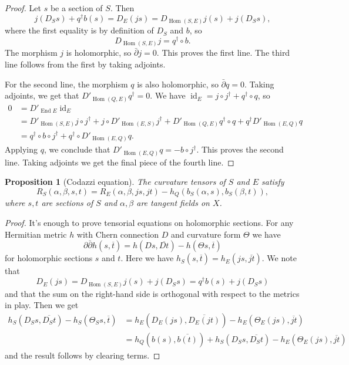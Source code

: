\documentclass[10pt,a4paper]{article}
\newtheorem{prop}[theo]{Proposition}
\newtheorem*{proof}{Proof}
\def\ov#1{\overline{#1}}
\DeclareMathOperator{\End}{End}
\DeclareMathOperator{\Hom}{Hom}
\DeclareMathOperator{\id}{id}
\begin{document}
\begin{proof}
Let $s$ be a section of $S$. Then
\[
j(D_S s) + q^\dagger b(s)
= D_E(js)
= D_{\Hom(S,E)}j (s) + j(D_S s),
\]
where the first equality is by definition of $D_S$ and $b$, so
\[
D_{\Hom(S,E)}j = q^\dagger \circ b.
\]
The morphism $j$ is holomorphic, so $\bar\partial j = 0$. This proves the first line. The third line follows from the first by taking adjoints.


For the second line, the morphism $q$ is also holomorphic, so $\bar\partial q = 0$. Taking adjoints, we get that $D'_{\Hom(Q,E)} q^\dagger = 0$.
We have $\id_E = j \circ j^\dagger + q^\dagger \circ q$, so
\begin{align*}
0
&= D'_{\End E} \id_E
\\
&= D'_{\Hom(S,E)} j \circ j^\dagger + j \circ D'_{\Hom(E,S)}j^\dagger
+ D'_{\Hom(Q,E)}q^\dagger \circ q + q^\dagger D'_{\Hom(E,Q)} q
\\
&= q^\dagger \circ b \circ j^\dagger + q^\dagger \circ D'_{\Hom(E,Q)}q.
\end{align*}
Applying $q$, we conclude that $D'_{\Hom(E,Q)}q = - b \circ j^\dagger$. This proves the second line. Taking adjoints we get the final piece of the fourth line.
\end{proof}


\begin{prop}[Codazzi equation]
\label{prop:codazzi-equation}
The curvature tensors of $S$ and $E$ satisfy
\[
R_S(\alpha,\beta,s,t)
= R_{E}(\alpha,\beta,js,jt)
- h_Q(b_S(\alpha,s), b_S(\beta,t)),
\]
where $s, t$ are sections of $S$ and $\alpha,\beta$ are tangent fields on $X$.
\end{prop}


\begin{proof}
It's enough to prove tensorial equations on holomorphic sections.
For any Hermitian metric $h$ with Chern connection $D$ and curvature form $\Theta$ we have
\[
\partial\bar\partial h(s, \ov t)
= h(Ds, \ov{Dt}) - h(\Theta s, \ov t)
\]
for holomorphic sections $s$ and $t$. Here we have $h_S(s,\ov t) = h_E(js, \ov{jt})$. We note that
\[
D_E(js)
= D_{\Hom(S,E)}j(s) + j(D_Ss)
= q^\dagger b(s) + j(D_Ss)
\]
and that the sum on the right-hand side is orthogonal with respect to the metrics in play. Then we get
\begin{align*}
h_S(D_Ss, \ov{D_St}) - h_S(\Theta_S s, \ov t)
&= h_E(D_E(js), \ov{D_E(jt)}) - h_E(\Theta_E(js), \ov{jt})
\\
&= h_Q(b(s), \ov{b(t)}) + h_S(D_Ss, \ov{D_St}) - h_E(\Theta_E(js), \ov{jt})
\end{align*}
and the result follows by clearing terms.
\end{proof}
\end{document}
